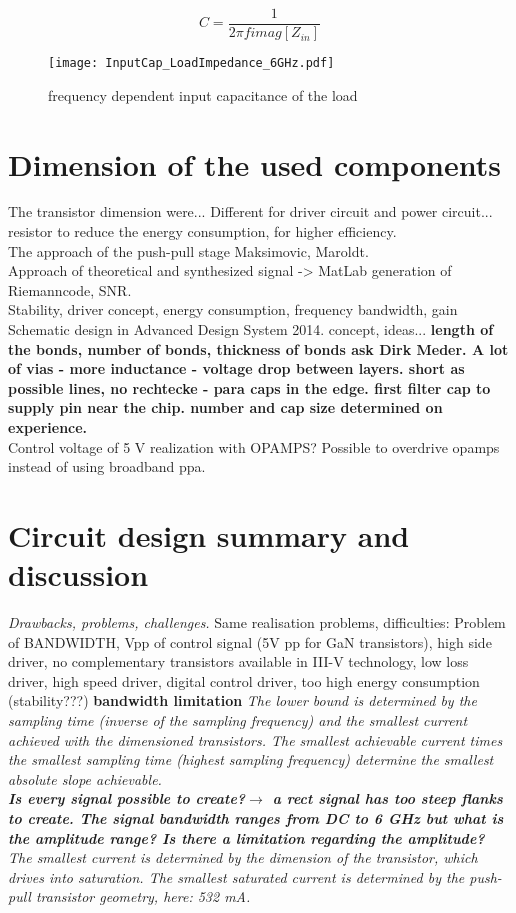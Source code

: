 \begin{equation}
C = \frac{1}{2 \pi f imag[Z_{in}]}
\end{equation}

 \begin{figure}[ht]
	\centering
  \texttt{[image: InputCap\_LoadImpedance\_6GHz.pdf]}
	\caption{frequency dependent input capacitance of the load}
	\label{fig:smith_load_impedance_inC}
\end{figure}
\section{Dimension of the used components}
The transistor dimension were... Different for driver circuit and power circuit... resistor to reduce the energy  consumption, for higher efficiency. \\ The
approach of the push-pull stage Maksimovic, Maroldt.\\
Approach of theoretical and synthesized signal -> MatLab generation of Riemanncode, SNR.\\ Stability, driver concept, energy consumption, frequency bandwidth, gain
Schematic design in Advanced Design System 2014. concept, ideas... 
\textbf{length of the bonds, number of bonds, thickness of bonds ask Dirk Meder. A lot of vias - more inductance - voltage drop between layers. short as possible lines, no rechtecke - para caps in the edge. first filter cap to supply pin near the chip. number and cap size determined on experience. }\\
Control voltage of 5 V realization with OPAMPS? Possible to overdrive opamps instead of using broadband ppa. 


\section{Circuit design summary and discussion}
\textit{Drawbacks, problems, challenges.}
Same realisation problems, difficulties: Problem of BANDWIDTH, Vpp of control signal (5V pp for GaN transistors), high side driver, no complementary transistors available in III-V technology, low loss driver, high speed driver, digital control driver, too high energy consumption (stability???)
\textbf{bandwidth limitation}
\textit{The lower bound is determined by the sampling time (inverse of the sampling frequency) and the smallest current achieved with the dimensioned transistors.
 The smallest achievable current times the smallest sampling time (highest sampling frequency) determine the smallest absolute slope achievable. \\
 \textbf{Is every signal possible to create?$\rightarrow$ a rect signal has too steep flanks to create. The signal bandwidth ranges from DC to 6 GHz but what is the amplitude range? Is there a limitation regarding the amplitude?}
\\
The smallest current is determined by the dimension of the transistor, which drives into saturation. 
The smallest saturated current is determined by the push-pull transistor geometry, here: 532 mA.}
